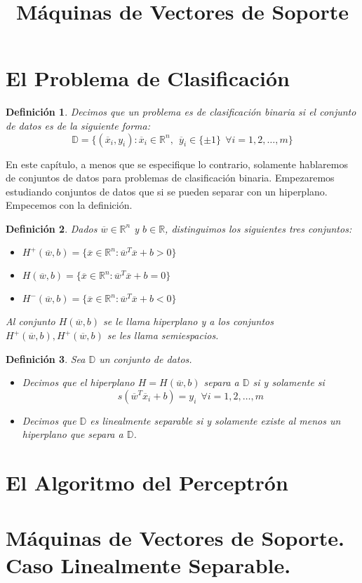 \documentclass[11pt]{article}
\newtheorem{definition}{Definición}[section]
\newcommand{\R}{\mathbb{R}}
\newcommand{\Rn}{\R^{n}}
\newcommand{\wv}{\overline{w}}
\newcommand{\x}{\overline{x}}
\newcommand{\y}{\overline{y}}
\newcommand{\Sm}{1,2,\ldots, m}
\newcommand{\Dat}{\mathbb{D}}
\begin{document}
\title{Máquinas de Vectores de Soporte}
\section{El Problema de Clasificación}

\begin{definition}
Decimos que un problema es de clasificación binaria si el conjunto de datos es de la siguiente forma:
$$\Dat=\{(\x_{i}, y_i): \x_{i}\in\Rn,\ \ \y_{i}\in\{\pm1\}\ \ \forall i = \Sm\}$$
\end{definition}

En este capítulo, a menos que se especifique lo contrario, solamente hablaremos de conjuntos de datos para problemas de clasificación binaria.
Empezaremos estudiando conjuntos de datos que si se pueden separar con un hiperplano. Empecemos con la definición.

\begin{definition}
Dados $\wv\in\Rn$ y $b\in\R$, distinguimos los siguientes tres conjuntos:
\begin{itemize}
\item[(i)] $H^{+}(\wv, b)=\{\x\in\Rn:\wv^{T}\x+b>0\}$
\item[(ii)] $H(\wv, b)=\{\x\in\Rn:\wv^{T}\x+b=0\}$
\item[(iii)] $H^{-}(\wv, b)=\{\x\in\Rn:\wv^{T}\x+b<0\}$
\end{itemize}
Al conjunto $H(\wv, b)$ se le llama \emph{hiperplano} y a los conjuntos $H^{+}(\wv, b), H^{+}(\wv, b)$ se les llama \emph{semiespacios}.
\end{definition}

\begin{definition}
Sea $\Dat$ un conjunto de datos.
\begin{itemize}
\item[(i)] Decimos que el hiperplano $H=H(\wv, b)$ separa a $\Dat$ si y solamente si
$$s(\wv^{T}\x_{i}+b)=y_{i}\ \ \forall i=\Sm$$
\item[(ii)] Decimos que $\Dat$ es linealmente separable si y solamente existe al menos un hiperplano que separa a $\Dat$.
\end{itemize}
\end{definition}
\section{El Algoritmo del Perceptrón}
\section{Máquinas de Vectores de Soporte. Caso Linealmente Separable.}
\end{document}
